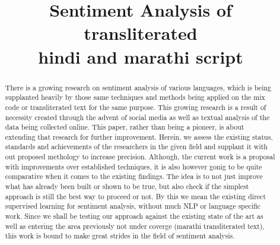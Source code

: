 \documentclass[conference]{IEEEtran}
\begin{document}
%
\title{Sentiment Analysis of transliterated\\ hindi and marathi script}


\author{
\and
{}
}






\maketitle

\begin{abstract}
        There is a growing research on
        sentiment analysis of various languages, which is being supplanted
        heavily by those same techniques and methods being applied on the mix
        code or transliterated text for the same purpose. This growing research
        is a result of necessity created through the advent of social media as
        well as textual analysis of the data being collected online. This
        paper, rather than being a pioneer, is about extending that research
        for further improvement. Herein, we assess the existing status,
        standards and achievements of the researchers in the given field and
        supplant it with out proposed methology to increase precision.
        Although, the current work is a
        proposal with improvements over established techniques, it is also
        however gonig to be quite comparative when it comes to the existing
        findings. The idea is to not just improve what has already been built
        or shown to be true, but also check if the simplest approach is still
        the best way to proceed or not. By this we mean the existing direct
        supervised learning for sentiment analysis, without much NLP or
        language specific work.
        Since we shall be testing our
        approach against the existing state of the art as well as entering the
        area previously not under coverge (marathi transliterated text), this work
        is bound to make great strides in the field of sentiment analysis.
\end{abstract}
\end{document}
